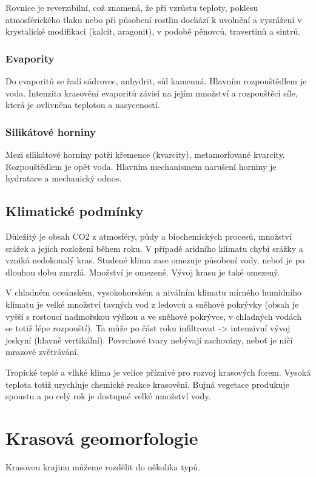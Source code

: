 
Rovnice je reverzibilní, což znamená, že při vzrůstu teploty, poklesu atmosférického tlaku nebo při působení rostlin dochází k uvolnění  a vysrážení  v krystalické modifikaci (kalcit, aragonit), v podobě pěnovců, travertinů a sintrů.

\subsubsection{Evapority}
Do evaporitů se řadí sádrovec, anhydrit, sůl kamenná. Hlavním rozpouštědlem je voda. Intenzita krasovění evaporitů závisí na jejím množství a rozpouštěcí síle, která je ovlivněna teplotou a nasyceností. 

\subsubsection{Silikátové horniny} 
Mezi silikátové horniny patří křemence (kvarcity), metamorfované kvarcity. Rozpouštědlem je opět voda.  Hlavním mechanismem narušení horniny je hydratace a mechanický odnos. 

\subsection{Klimatické podmínky}
Důležitý je obsah CO2 z atmosféry, půdy a biochemických procesů, množství srážek a jejich rozložení během roku. 
V případě aridního klimatu chybí srážky a vzniká nedokonalý kras. Studené klima zase omezuje působení vody, neboť je po dlouhou dobu zmrzlá. Množství  je omezené. Vývoj krasu je také omezený. 

V chladném oceánském, vysokohorském a niválním klimatu mírného humidního klimatu je velké množství tavných vod z ledovců a sněhové pokrývky (obsah  je vyšší s rostoucí nadmořskou výškou a ve sněhové pokrývce, v chladných vodách se totiž lépe rozpouští). Ta může po část roku infiltrovat -> intenzivní vývoj jeskyní (hlavně vertikální). Povrchové tvary nebývají zachovány, neboť je ničí mrazové zvětrávání. 

Tropické teplé a vlhké klima je velice příznivé pro rozvoj krasových forem. Vysoká teplota totiž urychluje chemické reakce krasovění. Bujná vegetace produkuje spoustu  a po celý rok je dostupné velké množství vody.

\section{Krasová geomorfologie}
Krasovou krajinu můžeme rozdělit do několika typů. 

